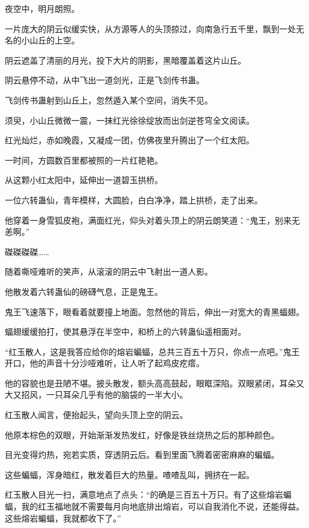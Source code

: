 
\begin{this_body}



夜空中，明月朗照。

一片庞大的阴云似缓实快，从方源等人的头顶掠过，向南急行五千里，飘到一处无名的小山丘的上空。

阴云遮盖了清丽的月光，投下大片的阴影，黑暗覆盖着这片山丘。

阴云悬停不动，从中飞出一道剑光，正是飞剑传书蛊。

飞剑传书蛊射到山丘上，忽然遁入某个空间，消失不见。

须臾，小山丘微微一震，一抹红光徐徐绽放而出剑逆苍穹全文阅读。

红光灿烂，赤如晚霞，又凝成一团，仿佛夜里升腾出了一个红太阳。

一时间，方圆数百里都被照的一片红艳艳。

从这颗小红太阳中，延伸出一道碧玉拱桥。

一位六转蛊仙，青年模样，大圆脸，白白净净，踏上拱桥，走了出来。

他穿着一身雪狐皮袍，满面红光，仰头对着头顶上的阴云朗笑道：“鬼王，别来无恙啊。”

磔磔磔磔……

随着嘶哑难听的笑声，从滚滚的阴云中飞射出一道人影。

他散发着六转蛊仙的磅礴气息，正是鬼王。

鬼王飞速落下，眼看着就要撞上地面。忽然他的背后，伸出一对宽大的青黑蝠翅。

蝠翅缓缓拍打，使其悬浮在半空中，和桥上的六转蛊仙遥相面对。

“红玉散人，这是我答应给你的熔岩蝙蝠，总共三百五十万只，你点一点吧。”鬼王开口，他的声音十分沙哑难听，让人听了起鸡皮疙瘩。

他的容貌也是丑陋不堪。披头散发，额头高高鼓起，眼眶深陷。双眼紧闭，耳朵又大又招风，一只耳朵几乎有他的脑袋的一半大小。

红玉散人闻言，便抬起头，望向头顶上空的阴云。

他原本棕色的双眼，开始渐渐发热发红，好像是铁丝烧热之后的那种颜色。

目光变得灼热，宛若实质，穿透阴云后。看到里面飞腾着密密麻麻的蝙蝠。

这些蝙蝠，浑身暗红，散发着巨大的热量。喳喳乱叫，拥挤在一起。

红玉散人目光一扫，满意地点了点头：“的确是三百五十万只。有了这些熔岩蝙蝠，我的红玉福地就不需要每月向地底排出熔岩，可以自我消化不说，还能得益。这些熔岩蝙蝠，我就都收下了。”


\end{this_body}
